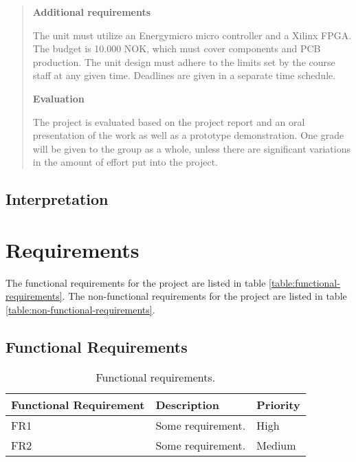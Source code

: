\begin{quote}
\textbf{Additional requirements}

The unit must utilize an Energymicro micro controller and a Xilinx FPGA.
The budget is 10.000 NOK, which must cover components and PCB production.
The unit design must adhere to the limits set by the course staff at any given time.
Deadlines are given in a separate time schedule.

\textbf{Evaluation}

The project is evaluated based on the project report and an oral presentation of the work as well as a prototype demonstration.
One grade will be given to the group as a whole, unless there are significant variations in the amount of effort put into the project. 

\end{quote}

\subsection{Interpretation}


\section{Requirements}

The functional requirements for the project are listed in table \vref{table:functional-requirements}. The non-functional requirements for the project are listed in table \vref{table:non-functional-requirements}.

 \subsection{Functional Requirements}

 \begin{table}
 \begin{center}
 \begin{tabular}{| l | l | l |}
 \hline
 Functional Requirement & Description & Priority\\
 \hline
 FR1 & Some requirement. & High \\
 FR2 & Some requirement. & Medium \\
 \hline
 \end{tabular}
 \caption{Functional requirements.}
 \label{table:functional-requirements}
 \end{center}
 \end{table}

